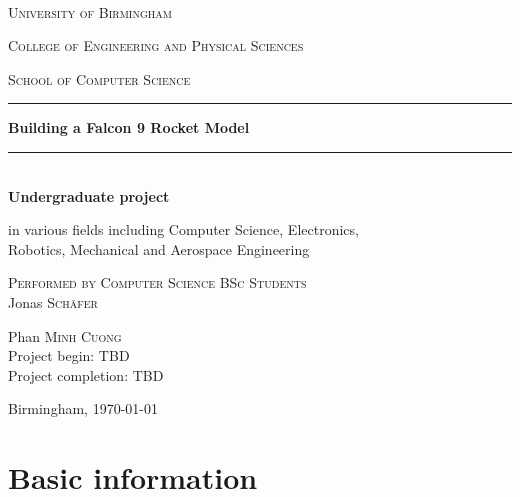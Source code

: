 \documentclass[a4paper,10pt]{article} %
\begin{document}
\thispagestyle{empty}
\newcommand{\Rule}{\rule{\textwidth}{1mm}}
\begin{center}
\ \\
\vspace{10mm}

\huge{\textsc{University of Birmingham}} \par
\vspace{7mm}
\Large{\textsc{College of Engineering and Physical Sciences}}\par
\vspace{2mm}
\Large{\textsc{School of Computer Science}}\par
\vspace{15mm}

\Rule
\vspace{11mm}
\huge\textbf{Building a Falcon 9 Rocket Model}\par
\vspace{9mm}
\Rule
\par
\ \\
\vspace{2mm}
\LARGE{\textbf{Undergraduate project}}\par
\vspace{4mm}
\large{in various fields including Computer Science, Electronics,\\ Robotics, Mechanical and Aerospace Engineering}


\vspace{12mm}

\textsc{Performed by Computer Science BSc Students} \ \\
\vspace{3mm}
Jonas \textsc{Schäfer}\par
Phan \textsc{Minh Cuong}
\vspace{5mm}
\\
Project begin: TBD \\
Project completion: TBD
\vspace{15mm}

Birmingham, \today\par

\vspace{30mm}

\end{center}
\newpage
\tableofcontents

\newpage

\section{Basic information}
\end{document}
